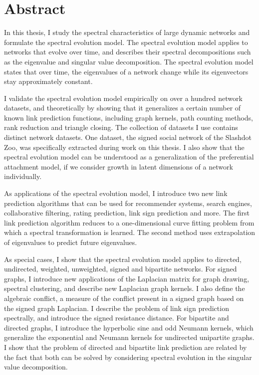 \documentclass[11pt,a4paper]{book}
\begin{document}
\clearpage
\section*{Abstract}
\begin{spacing}{1.3}
In this thesis, I study the spectral characteristics of large dynamic
networks and formulate the spectral evolution model.  The spectral
evolution model applies to networks that evolve over time, and describes
their spectral decompositions such as the eigenvalue and singular value
decomposition.  
The spectral evolution model states that over time, the eigenvalues of a
network change while its eigenvectors stay approximately constant. 

I validate the spectral evolution model empirically on over a hundred
network datasets, and theoretically by showing that it generalizes a
certain number of known link prediction functions, including graph
kernels, path counting methods, rank reduction and triangle closing.  
The collection of datasets I use contains distinct
network datasets.  One dataset, the signed social network of the
Slashdot Zoo, was specifically extracted during work on this thesis. 
I also show that the spectral evolution model can be understood as a
generalization of the preferential attachment model, if we consider growth
in latent dimensions of a network individually. 

As applications of the spectral evolution model, I introduce two new
link prediction algorithms that can be used for recommender systems,
search engines, collaborative filtering, rating prediction, link sign
prediction and more.  The first link prediction algorithm reduces to a
one-dimensional curve fitting problem from which a spectral
transformation is learned.  The second method uses extrapolation of
eigenvalues to predict future eigenvalues. 

As special cases, I show that the spectral evolution model applies to
directed, undirected, weighted, unweighted, signed and bipartite
networks.  
For signed graphs, I introduce new applications of the Laplacian matrix
for graph drawing, spectral clustering, and describe new Laplacian
graph kernels.
I also define the algebraic conflict, a measure of the 
conflict present in a signed graph based on the signed graph Laplacian. 
I describe the problem of link sign prediction spectrally, and introduce the signed
resistance distance. 
For bipartite and directed graphs, I introduce the hyperbolic sine and
odd Neumann kernels, which generalize the exponential and Neumann
kernels for undirected unipartite graphs. 
I show that the problem of directed and bipartite link prediction
are related by the fact that both can be solved by considering
spectral evolution in the singular value decomposition.


\end{spacing}
\end{document}
